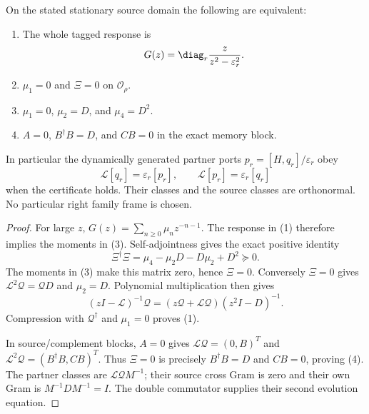 \documentclass[12pt,a4paper]{article}
\begin{document}
\begin{theorem}
\label{p4:thm:v2168-dynamical-fidelity}
On the stated stationary source domain the following are equivalent:
\begin{enumerate}
\item The whole tagged response is
\[
 G(z)=\diag_r\frac{z}{z^2-\varepsilon_r^2}.
\]
\item $\mu_1=0$ and $\Xi=0$ on $\mathscr O_\rho$.
\item $\mu_1=0$, $\mu_2=D$, and $\mu_4=D^2$.
\item $A=0$, $B^\dagger B=D$, and $CB=0$ in the exact memory block.
\end{enumerate}
In particular the dynamically generated partner ports
$p_r=[H,q_r]/\varepsilon_r$ obey
\[
 \boxed{\mathcal L[q_r]=\varepsilon_r[p_r],\qquad
        \mathcal L[p_r]=\varepsilon_r[q_r]}
\]
when the certificate holds. Their classes and the source classes are
orthonormal. No particular right family frame is chosen.
\end{theorem}
\begin{proof}
For large $z$, $G(z)=\sum_{n\ge0}\mu_n z^{-n-1}$. The response in (1)
therefore implies the moments in (3). Self-adjointness gives the exact
positive identity
\[
 \boxed{\Xi^\dagger\Xi
   =\mu_4-\mu_2D-D\mu_2+D^2\succeq0.}
\]
The moments in (3) make this matrix zero, hence $\Xi=0$.
Conversely $\Xi=0$ gives $\mathcal L^2\mathcal Q=\mathcal QD$ and
$\mu_2=D$. Polynomial multiplication then gives
\[
 (zI-\mathcal L)^{-1}\mathcal Q
   =(z\mathcal Q+\mathcal L\mathcal Q)(z^2I-D)^{-1}.
\]
Compression with $\mathcal Q^\dagger$ and $\mu_1=0$ proves (1).

In source/complement blocks, $A=0$ gives
$\mathcal L\mathcal Q=(0,B)^T$ and
$\mathcal L^2\mathcal Q=(B^\dagger B,CB)^T$.
Thus $\Xi=0$ is precisely $B^\dagger B=D$ and $CB=0$, proving (4).
The partner classes are $\mathcal L\mathcal Q M^{-1}$; their source cross
Gram is zero and their own Gram is $M^{-1}DM^{-1}=I$. The double
commutator supplies their second evolution equation.
\end{proof}
\end{document}
